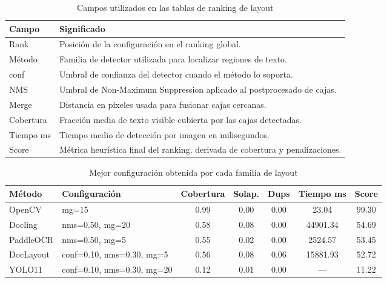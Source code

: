\documentclass[11pt, a4paper]{article}
\begin{document}
\begin{table}[H]
\centering
\caption{Campos utilizados en las tablas de ranking de layout}
\small
\begin{tabular}{p{3.2cm} p{10.3cm}}
\toprule
\textbf{Campo} & \textbf{Significado} \\
\midrule
Rank & Posici\'on de la configuraci\'on en el ranking global. \\
M\'etodo & Familia de detector utilizada para localizar regiones de texto. \\
conf & Umbral de confianza del detector cuando el m\'etodo lo soporta. \\
NMS & Umbral de Non-Maximum Suppression aplicado al postprocesado de cajas. \\
Merge & Distancia en p\'ixeles usada para fusionar cajas cercanas. \\
Cobertura & Fracci\'on media de texto visible cubierta por las cajas detectadas. \\
Tiempo ms & Tiempo medio de detecci\'on por imagen en milisegundos. \\
Score & M\'etrica heur\'istica final del ranking, derivada de cobertura y penalizaciones. \\
\bottomrule
\end{tabular}
\normalsize
\end{table}

\begin{table}[H]
\centering
\caption{Mejor configuraci\'on obtenida por cada familia de layout}
\small
\begin{tabular}{>{\raggedright\arraybackslash}p{2.1cm} >{\raggedright\arraybackslash}p{3.5cm} c c c c c}
\toprule
\textbf{M\'etodo} & \textbf{Configuraci\'on} & \textbf{Cobertura} & \textbf{Solap.} & \textbf{Dups} & \textbf{Tiempo ms} & \textbf{Score} \\
\midrule
OpenCV & mg=15 & 0.99 & 0.00 & 0.00 & 23.04 & 99.30 \\
Docling & nms=0.50, mg=20 & 0.58 & 0.08 & 0.00 & 44901.34 & 54.69 \\
PaddleOCR & nms=0.50, mg=5 & 0.55 & 0.02 & 0.00 & 2524.57 & 53.45 \\
DocLayout & conf=0.10, nms=0.30, mg=5 & 0.56 & 0.08 & 0.06 & 15881.93 & 52.72 \\
YOLO11 & conf=0.10, nms=0.30, mg=20 & 0.12 & 0.01 & 0.00 & --- & 11.22 \\
\bottomrule
\end{tabular}
\normalsize
\end{table}
\end{document}
